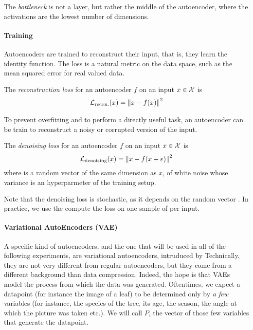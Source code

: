 \documentclass[]{scrarticle}
\begin{document}
The \emph{bottleneck} is not a layer, but rather the middle of the autoencoder,
where the activations are the lowest number of dimensions.

\paragraph{Training}
Autoencoders are trained to reconstruct their input,
that is, they learn the identity function. The loss is a natural metric
on the data space, such as the mean squared error for real valued data.

\begin{definition}
  The \emph{reconstruction loss} for an autoencoder $f$ on an input $x \in \mathcal X$
  is
  \[
    \mathcal L_{\text{recon.}}(x) = \left\| x - f(x) \right\|^2
  \]
\end{definition}

To prevent overfitting and to perform a directly useful task,
an autoencoder can be train to reconstruct a noisy or corrupted
version of the input.
\begin{definition}
  The \emph{denoising loss} for an autoencoder $f$ on an input $x \in \mathcal X$ is
  \[
    \mathcal L_{\text{denoising}}(x) = \left\| x - f(x + \varepsilon) \right\|^2
  \]
  where \e is a random vector of the same dimension as $x$, of white noise
  whose variance is an hyperparmeter of the training setup.

  Note that the denoising loss is stochastic, as it depends on the random
  vector \e. In practice, we use the compute the loss on one sample of \e
  per input.
\end{definition}

\paragraph{Variational AutoEncoders (VAE)}
A specific kind of autoencoders, and the one that will be
used in all of the following experiments,
are variational autoencoders,
intruduced by \cite{Kingma2013AutoEncodingVB}
Technically, they are not very different from regular autoencoders,
but they come from a different background than data compression.
Indeed, the hope is that VAEs model the process from which the data was generated.
Oftentimes, we expect a datapoint (for instance the image of a leaf) to be determined
only by \textit{a few} variables (for instance, the species of the tree, its age,
the season, the angle at which the picture was taken etc.).
We will call $P$, the vector of those few variables that generate the datapoint.
\end{document}
